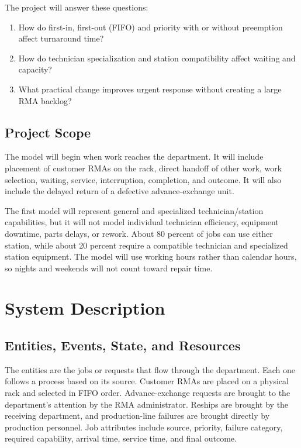 \documentclass[12pt, letterpaper, twoside]{article}
\begin{document}
The project will answer these questions:

\begin{enumerate}
    \item How do first-in, first-out (FIFO) and priority with or without preemption affect turnaround time?
    \item How do technician specialization and station compatibility affect waiting and capacity?
    \item What practical change improves urgent response without creating a large RMA backlog?
\end{enumerate}

\subsection{Project Scope}

The model will begin when work reaches the department. It will include placement of customer
RMAs on the rack, direct handoff of other work, work selection, waiting, service,
interruption, completion, and outcome. It will also include the delayed return of a
defective advance-exchange unit.

The first model will represent general and specialized technician/station capabilities, but
it will not model individual technician efficiency, equipment downtime, parts delays, or
rework. About 80 percent of jobs can use either station, while about 20 percent require a
compatible technician and specialized station equipment. The model will use working hours rather than calendar hours, so nights
and weekends will not count toward repair time.
\section{System Description}
\label{sec:system}

\subsection{Entities, Events, State, and Resources}

The entities are the jobs or requests that flow through the department. Each one follows a
process based on its source. Customer RMAs are placed on a physical rack and selected in
FIFO order. Advance-exchange requests are brought to the department's attention by the RMA
administrator. Reships are brought by the receiving department, and production-line
failures are brought directly by production personnel. Job attributes include source,
priority, failure category, required capability, arrival time, service time, and final
outcome.
\end{document}
